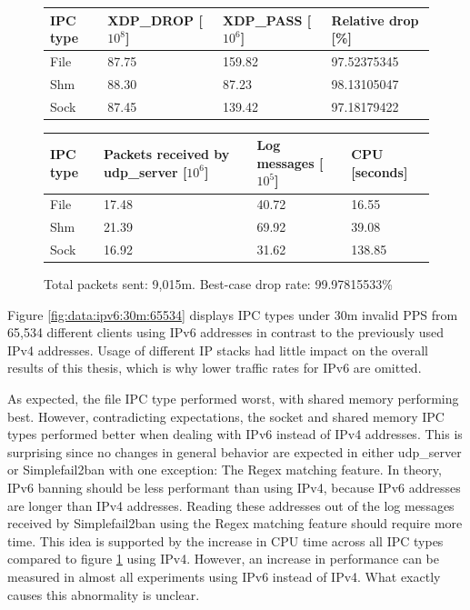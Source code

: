 \begin{figure}[!h]
	\centering
	\scriptsize
	\begin{tabular}{llll}
		\toprule
		\textbf{IPC type} & \textbf{XDP\_DROP [$10^8$]} & \textbf{XDP\_PASS [$10^6$]} & \textbf{Relative drop [\%]}\\ \midrule 
		File & 87.75 & 159.82 & 97.52375345 \\
        Shm & 88.30 & 87.23 & 98.13105047 \\
        Sock & 87.45 & 139.42 & 97.18179422 \\
	\bottomrule
	\end{tabular}
    \begin{tabular}{llll}
		\toprule
		\textbf{IPC type} & \textbf{Packets received by udp\_server [$10^6$]} & \textbf{Log messages [$10^5$]} & \textbf{CPU [seconds]} \\ \midrule 
		File & 17.48 & 40.72 & 16.55 \\
        Shm & 21.39 & 69.92 & 39.08 \\
        Sock & 16.92 & 31.62 & 138.85 \\
	\bottomrule
	\end{tabular}
	\caption[Simplefail2ban, IPv4, 30m \ac{PPS}, 65,534 malicious clients]{Total packets sent: 9,015m. Best-case drop rate: 99.97815533\%}
	\label{fig:data:ipv4:30m:65534}
\end{figure}

Figure \ref{fig:data:ipv6:30m:65534} displays \ac{IPC} types under 30m invalid \ac{PPS} from 65,534 different clients using IPv6 addresses in contrast to the previously used IPv4 addresses.
Usage of different \ac{IP} stacks had little impact on the overall results of this thesis, which is why lower traffic rates for IPv6 are omitted.

As expected, the file \ac{IPC} type performed worst, with shared memory performing best.
However, contradicting expectations, the socket and shared memory \ac{IPC} types performed better when dealing with IPv6 instead of IPv4 addresses.
This is surprising since no changes in general behavior are expected in either udp\_server or Simplefail2ban with one exception: The \ac{Regex} matching feature.
In theory, IPv6 banning should be less performant than using IPv4, because IPv6 addresses are longer than IPv4 addresses.
Reading these addresses out of the log messages received by Simplefail2ban using the \ac{Regex} matching feature should require more time.
This idea is supported by the increase in \ac{CPU} time across all \ac{IPC} types compared to figure \ref{fig:data:ipv4:30m:65534} using IPv4.
However, an increase in performance can be measured in almost all experiments using IPv6 instead of IPv4.
What exactly causes this abnormality is unclear.

